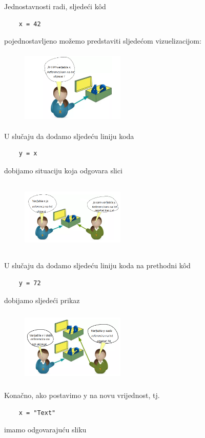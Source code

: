 Jednostavnosti radi, sljedeći k\^od
\begin{verbatim}
    x = 42
\end{verbatim}
 pojednostavljeno možemo predstaviti sljedećom vizuelizacijom:
\begin{figure}[H]
	\centering
   \includegraphics[width=140pt,height=100pt]{slike/variable_object.png}
\end{figure}
U slučaju da dodamo sljedeću liniju   koda 
\begin{verbatim}
	y = x
\end{verbatim}
dobijamo situaciju    koja odgovara slici

\begin{figure}[H]
	\centering
	\includegraphics[width=140pt,height=100pt]{slike/point_two_vars.png}
\end{figure}
U slučaju da dodamo sljedeću liniju koda na prethodni k\^od
\begin{verbatim}
	y = 72
\end{verbatim}
dobijamo sljedeći prikaz
\begin{figure}[H]
	\centering
	\includegraphics[width=140pt,height=100pt]{slike/vars_different_assigned.png}
\end{figure}
Konačno, ako postavimo y na novu vrijednost, tj.
\begin{verbatim}
	x = "Text" 
\end{verbatim}
imamo odgovarajuću sliku 

